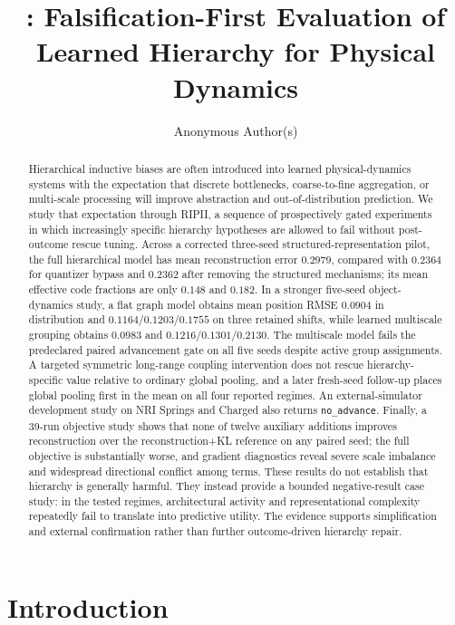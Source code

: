 \documentclass[10pt]{article}
\title{\RIPII: Falsification-First Evaluation of Learned Hierarchy for Physical Dynamics}
\author{Anonymous Author(s)}
\date{}
\newcommand{\RIPII}{\textsc{RIPII}}
\begin{document}
\maketitle

\begin{abstract}
Hierarchical inductive biases are often introduced into learned physical-dynamics systems with the expectation that discrete bottlenecks, coarse-to-fine aggregation, or multi-scale processing will improve abstraction and out-of-distribution prediction. We study that expectation through \RIPII, a sequence of prospectively gated experiments in which increasingly specific hierarchy hypotheses are allowed to fail without post-outcome rescue tuning. Across a corrected three-seed structured-representation pilot, the full hierarchical model has mean reconstruction error $0.2979$, compared with $0.2364$ for quantizer bypass and $0.2362$ after removing the structured mechanisms; its mean effective code fractions are only $0.148$ and $0.182$. In a stronger five-seed object-dynamics study, a flat graph model obtains mean position RMSE $0.0904$ in distribution and $0.1164/0.1203/0.1755$ on three retained shifts, while learned multiscale grouping obtains $0.0983$ and $0.1216/0.1301/0.2130$. The multiscale model fails the predeclared paired advancement gate on all five seeds despite active group assignments. A targeted symmetric long-range coupling intervention does not rescue hierarchy-specific value relative to ordinary global pooling, and a later fresh-seed follow-up places global pooling first in the mean on all four reported regimes. An external-simulator development study on NRI Springs and Charged also returns \texttt{no\_advance}. Finally, a 39-run objective study shows that none of twelve auxiliary additions improves reconstruction over the reconstruction+KL reference on any paired seed; the full objective is substantially worse, and gradient diagnostics reveal severe scale imbalance and widespread directional conflict among terms. These results do not establish that hierarchy is generally harmful. They instead provide a bounded negative-result case study: in the tested regimes, architectural activity and representational complexity repeatedly fail to translate into predictive utility. The evidence supports simplification and external confirmation rather than further outcome-driven hierarchy repair.
\end{abstract}

\section{Introduction}
\end{document}
